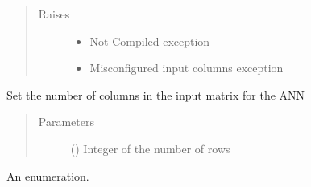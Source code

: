 \documentclass[letterpaper,10pt,english]{sphinxmanual}
\begin{document}
\begin{fulllineitems}
\begin{fulllineitems}
\begin{quote}
\begin{description}
\item[{Raises}] \leavevmode\begin{itemize}
\item {} 
 \textendash{} Not Compiled exception

\item {} 
 \textendash{} Misconfigured input columns exception

\end{itemize}

\end{description}\end{quote}

\end{fulllineitems}


\begin{fulllineitems}
\label{\detokenize{index:Coursework.model.ANN.set_input_cols}}
Set the number of columns in the input matrix for the ANN
\begin{quote}\begin{description}
\item[{Parameters}] \leavevmode
{} () \textendash{} Integer of the number of rows

\end{description}\end{quote}

\end{fulllineitems}


\end{fulllineitems}


\begin{fulllineitems}
\label{\detokenize{index:Coursework.model.ActivationFunction}}
An enumeration.

\end{fulllineitems}
\end{document}
